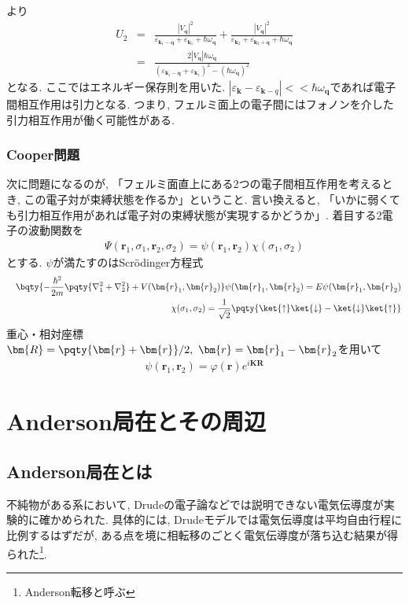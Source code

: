 \documentclass[10.5pt,a4paper]{jreport}
\begin{document}
より
\begin{eqnarray}
  U_2 &=& \frac{|V_{\bm q}|^2}{\varepsilon_{\bm{k}_1 - \bm{q}} +\varepsilon_{\bm{k}_1} + \hbar\omega_{\bm{q}}} + \frac{|V_{\bm q}|^2}{\varepsilon_{\bm{k}_2} +\varepsilon_{\bm{k}_2 + \bm{q}} + \hbar\omega_{\bm{q}}}\\
  &=& \frac{2|V_{\bm q}|\hbar\omega_{\bm q}}{(\varepsilon_{\bm{k}_1 - \bm{q}} +\varepsilon_{\bm{k}_1})^2-(\hbar\omega_{\bm q})^2}
\end{eqnarray}
となる. ここではエネルギー保存則を用いた. $|\varepsilon_{\bm k} - \varepsilon_{\bm k-q}| <\!< \hbar\omega_{\bm q}$であれば電子間相互作用は引力となる. つまり, フェルミ面上の電子間にはフォノンを介した引力相互作用が働く可能性がある.
\subsection{Cooper問題}
次に問題になるのが, 「フェルミ面直上にある2つの電子間相互作用を考えるとき, この電子対が束縛状態を作るか」ということ. 言い換えると, 「いかに弱くても引力相互作用があれば電子対の束縛状態が実現するかどうか」. 着目する2電子の波動関数を
\begin{eqnarray}
  \Psi(\bm{r}_1, \sigma_1, \bm{r}_2, \sigma_2) = \psi(\bm{r}_1, \bm{r}_2)\chi(\sigma_1, \sigma_2)
\end{eqnarray}
とする. $\psi$が満たすのはScr\"odinger方程式
\begin{eqnarray}
  &&\bqty{-\frac{\hbar^2}{2m}\pqty{\nabla^2_1 + \nabla^2_2} + V(\bm{r}_1, \bm{r}_2)}\psi(\bm{r}_1, \bm{r}_2) = E\psi(\bm{r}_1, \bm{r}_2)\\
  &&\chi(\sigma_1, \sigma_2) = \frac{1}{\sqrt{2}}\pqty{\ket{\uparrow}\ket{\downarrow} - \ket{\downarrow}\ket{\uparrow}}
\end{eqnarray}
重心・相対座標$\bm{R} = \pqty{\bm{r}+\bm{r}}/2,\ \bm{r} = \bm{r}_1 - \bm{r}_2$を用いて
\begin{eqnarray}
  \psi(\bm{r}_1,\bm{r}_2) = \varphi(\bm{r})e^{i\bm{KR}}
\end{eqnarray}
\newpage
\chapter{Anderson局在とその周辺}
\section{Anderson局在とは}
不純物がある系において, Drudeの電子論などでは説明できない電気伝導度が実験的に確かめられた. 具体的には, Drudeモデルでは電気伝導度は平均自由行程に比例するはずだが, ある点を境に相転移のごとく電気伝導度が落ち込む結果が得られた\footnote{Anderson転移と呼ぶ}.
\end{document}
